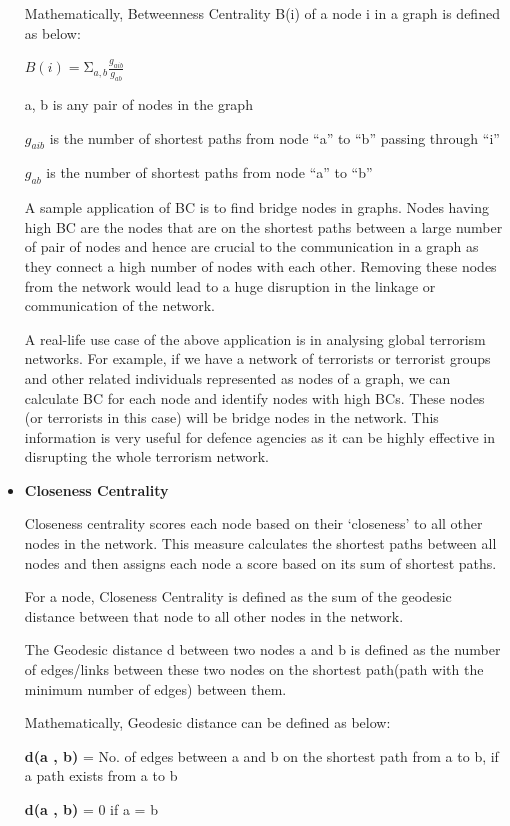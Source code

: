\documentclass[12pt, a4paper]{report}
\begin{document}
\begin{itemize}
    Mathematically, Betweenness Centrality B(i) of a node i in a graph is defined as below:

    $ B\left(i\right)=\mathrm{\Sigma}_{a,b}\frac{g_{aib}}{g_{ab}} $

    a, b is any pair of nodes in the graph
   
    $g_{aib}$ is the number of shortest paths from node “a” to “b” passing through “i”
    
    $g_{ab}$ is the number of shortest paths from node “a” to “b”

    A sample application of BC is to find bridge nodes in graphs. Nodes having high BC are the nodes that are on the shortest paths between a large number of pair of nodes and hence are crucial to the communication in a graph as they connect a high number of nodes with each other. Removing these nodes from the network would lead to a huge disruption in the linkage or communication of the network.

    A real-life use case of the above application is in analysing global terrorism networks. For example, if we have a network of terrorists or terrorist groups and other related individuals represented as nodes of a graph, we can calculate BC for each node and identify nodes with high BCs. These nodes (or terrorists in this case) will be bridge nodes in the network. This information is very useful for defence agencies as it can be highly effective in disrupting the whole terrorism network. 
    \item \textbf{Closeness Centrality}

    Closeness centrality scores each node based on their ‘closeness’ to all other nodes in the network. This measure calculates the shortest paths between all nodes and then assigns each node a score based on its sum of shortest paths.

    For a node, Closeness Centrality is defined as the sum of the geodesic distance between that node to all other nodes in the network.
    
    The Geodesic distance d between two nodes a and b is defined as the number of edges/links between these two nodes on the shortest path(path with the minimum number of edges) between them.
    
    Mathematically, Geodesic distance can be defined as below:
    
    \textbf{d(a , b)} = No. of edges between a and b on the shortest path from a to b, if a path exists from a to b
    
    \textbf{d(a , b)} = 0 if a = b
    

\end{itemize}
\end{document}
